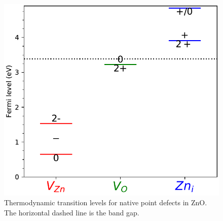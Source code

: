 


\begin{figure}[tbh!]
	\centering
	\includegraphics[width=0.4\linewidth]{"images/rnd/trans_lvl"}
	\caption[Thermodynamic transition levels for native point defects in ZnO]{Thermodynamic transition levels for native point defects in ZnO. The horizontal dashed line is the band gap.}
	\label{fig:transition_level}
\end{figure}


